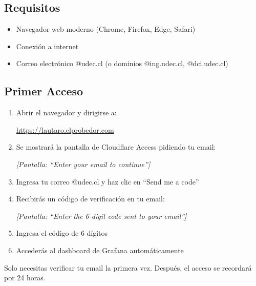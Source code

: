 \documentclass[12pt,a4paper]{article}
\begin{document}
\subsection{Requisitos}

\begin{itemize}
    \item Navegador web moderno (Chrome, Firefox, Edge, Safari)
    \item Conexi\'on a internet
    \item Correo electr\'onico @udec.cl (o dominios @ing.udec.cl, @dci.udec.cl)
\end{itemize}

\subsection{Primer Acceso}

\begin{enumerate}
    \item Abrir el navegador y dirigirse a:

    \begin{center}
    \url{https://lautaro.elprobedor.com}
    \end{center}

    \item Se mostrar\'a la pantalla de Cloudflare Access pidiendo tu email:

    \begin{center}
    \textit{[Pantalla: ``Enter your email to continue'']}
    \end{center}

    \item Ingresa tu correo @udec.cl y haz clic en ``Send me a code''

    \item Recibir\'as un c\'odigo de verificaci\'on en tu email:

    \begin{center}
    \textit{[Pantalla: ``Enter the 6-digit code sent to your email'']}
    \end{center}

    \item Ingresa el c\'odigo de 6 d\'igitos

    \item Acceder\'as al dashboard de Grafana autom\'aticamente
\end{enumerate}

\begin{tipbox}
Solo necesitas verificar tu email la primera vez. Despu\'es, el acceso se recordar\'a por 24 horas.
\end{tipbox}
\end{document}
